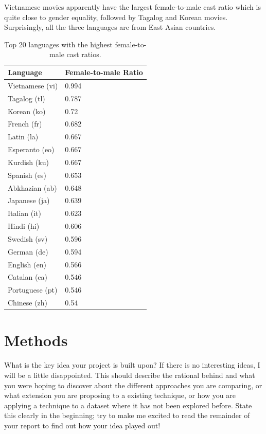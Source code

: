 \documentclass[12pt]{article}
\begin{document}
Vietnamese movies apparently have the largest female-to-male cast ratio which is quite close to gender equality, followed by Tagalog and Korean movies. Surprisingly, all the three languages are from East Asian countries. 

\begin{table}[H]
\begin{center}
\begin{tabu} to 0.6\textwidth { | X[c] | X[c] | }
\hline
\textbf{Language} & \textbf{Female-to-male Ratio} \\ \hline
Vietnamese (vi) & 0.994 \\
Tagalog (tl) & 0.787 \\
Korean (ko) & 0.72 \\
French (fr) & 0.682 \\
Latin (la) & 0.667 \\
Esperanto (eo) & 0.667 \\
Kurdish (ku) & 0.667 \\
Spanish (es) & 0.653 \\
Abkhazian (ab) & 0.648 \\
Japanese (ja) & 0.639 \\
Italian (it) & 0.623 \\
Hindi (hi) & 0.606 \\
Swedish (sv) & 0.596 \\
German (de) & 0.594 \\
English (en) & 0.566 \\
Catalan (ca) & 0.546 \\
Portuguese (pt) & 0.546 \\
Chinese (zh) & 0.54 \\ \hline
\end{tabu}
\end{center}
\caption{Top 20 languages with the highest female-to-male cast ratios.}
\label{lang_female_male_ratio}
\end{table}

\section{Methods}

What is the key idea your project is built upon? If there is no interesting ideas, I will be a little disappointed. This should describe the rational behind and what you were hoping to discover about the different approaches you are comparing, or what extension you are proposing to a existing technique, or how you are applying a technique to a dataset where it has not been explored before. State this clearly in the beginning; try to make me excited to read the remainder of your report to find out how your idea played out!
\end{document}
